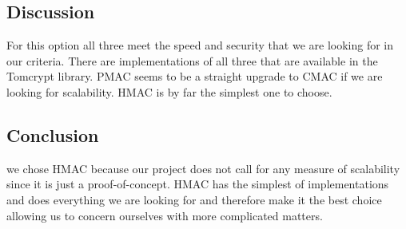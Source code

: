 \subsection{Discussion}     
For this option all three meet the speed and security that we are looking for in our criteria. There are implementations of all three that are available in the Tomcrypt library. PMAC seems to be a straight upgrade to CMAC if we are looking for scalability. HMAC is by far the simplest one to choose. 
\subsection{Conclusion}
we chose HMAC because our project does not call for any measure of scalability since it is just a proof-of-concept. HMAC has the simplest of implementations and does everything we are looking for and therefore make it the best choice allowing us to concern ourselves with more complicated matters.


\patchcmd{\thebibliography}
{}{}{}{}


